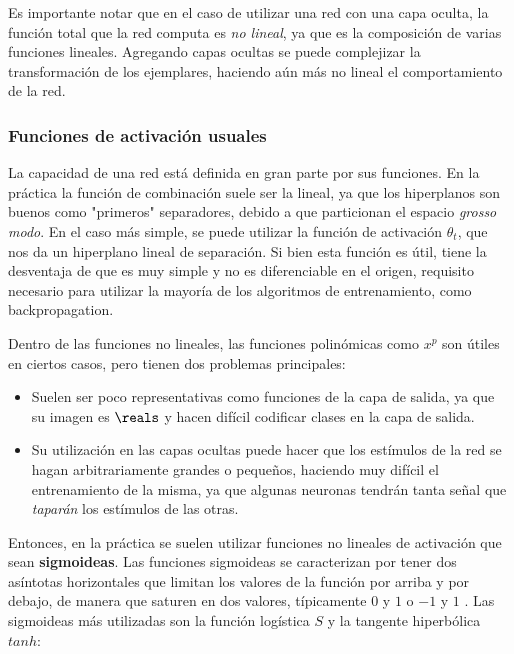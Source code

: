 Es importante notar que en el caso de utilizar una red con una capa oculta, la función total que la red computa es \textit{no lineal}, ya que es la composición de varias funciones lineales. Agregando capas ocultas se puede complejizar la transformación de los ejemplares, haciendo aún más no lineal el comportamiento de la red. 

\subsubsection{Funciones de activación usuales}

La capacidad de una red está definida en gran parte por sus funciones. En la práctica la función de combinación suele ser la lineal, ya que los hiperplanos son buenos como "primeros" separadores, debido a que particionan el espacio \textit{grosso modo}. En el caso más simple, se puede utilizar la función de activación $\theta_t$, que nos da un hiperplano lineal de separación. Si bien esta función es útil, tiene la desventaja de que es muy simple y no es diferenciable en el origen, requisito necesario para utilizar la mayoría de los algoritmos de entrenamiento, como backpropagation.

Dentro de las funciones no lineales, las funciones polinómicas como $x^p$ son útiles en ciertos casos, pero tienen dos problemas principales:

\begin{itemize}
\item Suelen ser poco representativas como funciones de la capa de salida, ya que su imagen es $\reals$ y hacen difícil codificar clases en la capa de salida.
\item Su utilización en las capas ocultas puede hacer que los estímulos de la red se hagan arbitrariamente grandes o pequeños, haciendo muy difícil el entrenamiento de la misma, ya que algunas neuronas tendrán tanta señal que \textit{taparán} los estímulos de las otras.
\end{itemize} 

Entonces, en la práctica se suelen utilizar funciones no lineales de activación que sean \textbf{sigmoideas}. Las funciones sigmoideas se caracterizan por tener dos asíntotas horizontales que limitan los valores de la función por arriba y por debajo, de manera que saturen en dos valores, típicamente $0$ y $1$ o $-1$ y $1$ \cite{lecun1998}. Las sigmoideas más utilizadas son la función logística $S$ y la tangente hiperbólica $tanh$:

\newcommand{\logistic}{\frac{1}{1+ e^{-x}}}
\newcommand{\tanhdef}{\frac{sinh(x)}{cosh(x)}}

